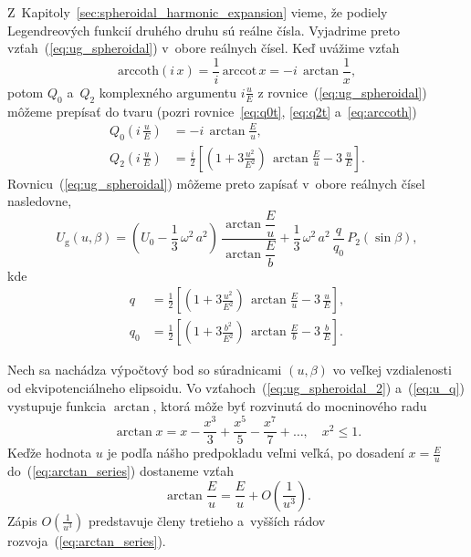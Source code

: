\documentclass[a4paper,12pt]{book}
\newcommand{\gidx}{\mathrm g}
\begin{document}
Z~Kapitoly~\ref{sec:spheroidal_harmonic_expansion} vieme, že podiely 
Legendreových funkcií druhého druhu sú reálne čísla.  Vyjadrime preto 
vzťah~(\ref{eq:ug_spheroidal}) v~obore reálnych čísel.  Keď uvážime vzťah 
\parencite{Moritz1967}
%
\begin{equation}
\mathrm{arccoth} (i \, x) = \frac{1}{i} \, \mathrm{arccot} \, x = -i \, 
\arctan\frac{1}{x}{,}
\end{equation}
%
potom $Q_0$ a~$Q_2$ komplexného argumentu $i \frac{u}{E}$ 
z rovnice~(\ref{eq:ug_spheroidal}) môžeme prepísať do tvaru (pozri 
rovnice~\ref{eq:q0t}, \ref{eq:q2t} a~\ref{eq:arccoth})
%
\begin{align}
Q_0\left( i \, \frac{u}{E} \right) &= -i \, \arctan\frac{E}{u}{,}\\
%
Q_2\left( i \, \frac{u}{E} \right) &= \frac{i}{2} \left[ \left( 
1 + 3 \frac{u^2}{E^2} \right) \, \arctan\frac{E}{u} - 3 \, \frac{u}{E} 
\right]{.}
\end{align}
%
Rovnicu~(\ref{eq:ug_spheroidal}) môžeme preto zapísať v~obore reálnych čísel 
nasledovne,
%
\begin{equation}
\label{eq:ug_spheroidal_2}
U_\gidx(u, \beta) = \left( U_0 - \frac{1}{3} \, \omega^2 \, a^2 \right) \, 
\frac{\arctan\dfrac{E}{u}}{\arctan\dfrac{E}{b}} + \frac{1}{3} \, \omega^2 \, 
a^2 \, \frac{q}{q_0} \, P_2(\sin\beta){,}
\end{equation}
%
kde
%
\begin{align}
\label{eq:u_q}
q &= \frac{1}{2} \left[ \left( 1 + 3 \frac{u^2}{E^2} \right) \, 
\arctan\frac{E}{u} - 3 \, \frac{u}{E} \right]{,}\\
%
q_0 &= \frac{1}{2} \left[ \left( 1 + 3 \frac{b^2}{E^2} \right) \, 
\arctan\frac{E}{b} - 3 \, \frac{b}{E} \right]{.}
\end{align}

Nech sa nachádza výpočtový bod so súradnicami $(u, \beta)$ vo veľkej 
vzdialenosti od ekvipotenciálneho elipsoidu.  Vo 
vzťahoch~(\ref{eq:ug_spheroidal_2}) a~(\ref{eq:u_q}) vystupuje funkcia 
$\arctan$, ktorá môže byť rozvinutá do mocninového radu 
\parencite{Gradshteyn2007}
%
\begin{equation}
\label{eq:arctan_series}
\arctan x = x - \frac{x^3}{3} + \frac{x^5}{5} - \frac{x^7}{7} + \dots{,} \quad 
x^2 \leq 1{.}
\end{equation}
%
Keďže hodnota $u$ je podľa nášho predpokladu veľmi veľká, po dosadení $x 
= \frac{E}{u}$ do~(\ref{eq:arctan_series}) dostaneme vzťah
%
\begin{equation}
\label{eq:eu_atan}
\arctan\frac{E}{u} = \frac{E}{u} + O\left( \frac{1}{u^3} \right){.}
\end{equation}
%
Zápis $O\left( \frac{1}{u^3} \right)$ predstavuje členy tretieho a~vyšších 
rádov rozvoja~(\ref{eq:arctan_series}).
\end{document}
